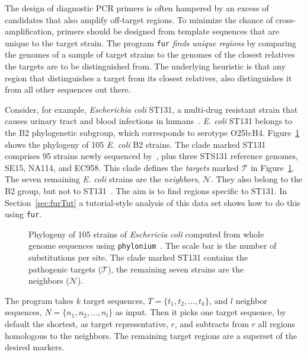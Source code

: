 The design of diagnostic PCR primers is often hampered by an excess of
candidates that also amplify off-target regions. To minimize the
chance of cross-amplification, primers should be designed from
template sequences that are unique to the target strain. The program
\texttt{fur} \emph{finds unique regions} by comparing the genomes of a
sample of target strains to the genomes of the closest relatives the
targets are to be distinguished from. The underlying heuristic is that
any region that distinguishes a target from its closest relatives,
also distinguishes it from all other sequences out there.

Consider, for example, \textit{Escherichia coli} ST131, a multi-drug
resistant strain that causes urinary tract and blood infections in
humans~\cite{pet14:glo}. \emph{E. coli} ST131 belongs to the B2
phylogenetic subgroup, which corresponds to serotype O25b:H4.
Figure~\ref{fig:eco} shows the phylogeny of 105 \emph{E. coli} B2
strains. The clade marked ST131 comprises 95 strains newly sequenced
by~\cite{pet14:glo}, plus three STS131 reference genomes, SE15, NA114,
and EC958. This clade defines the \emph{targets} marked $\mathcal{T}$
in Figure~\ref{fig:eco}. The seven remaining
\emph{E. coli} strains are the \emph{neighbors}, $\mathcal{N}$. They also
belong to the B2 group, but not to ST131~\cite{pet14:glo}. The aim is
to find regions specific to ST131. In Section~\ref{sec:furTut} a
tutorial-style analysis of this data set shows how to do this
using \texttt{fur}.

    \begin{figure}
      \begin{center}
	\tiny
	\resizebox{\textwidth}{!}{}
      \end{center}
      \caption{Phylogeny of 105 strains of \emph{Eschericia coli}
	computed from whole genome sequences using
	\texttt{phylonium}~\cite{klo20:phy}. The scale bar is the number of
	substitutions per site. The clade marked ST131 contains the
	pathogenic targets ($\mathcal{T}$), the remaining seven
	strains are the neighbors ($\mathcal{N}$).}\label{fig:eco}
    \end{figure}


The program takes $k$ target sequences, $T=\{t_1,t_2,...,t_k\}$, and
$l$ neighbor sequences, $N=\{n_1,n_2,...,n_l\}$ as input. Then it
picks one target sequence, by default the shortest, as target
representative, $r$, and subtracts from $r$ all regions homologous to
the neighbors. The remaining target regions are a superset of the
desired markers.

